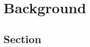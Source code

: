 \documentclass[../main.tex]{subfiles}
\begin{document}
\chapter{Background}
\label{chapter:background}
\vspace{-10pt}

\section{Section}
\vspace{-10pt}

\lipsum[1]

\biblio
\end{document}

